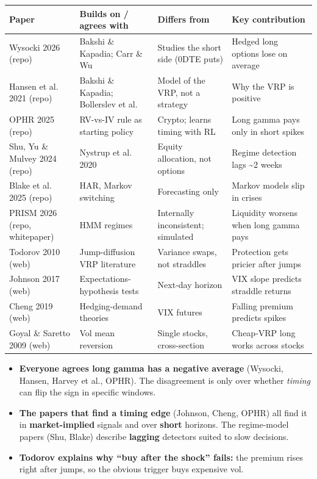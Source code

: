 \documentclass{article}
\begin{document}
\begin{center}\small
\begin{tabularx}{\linewidth}{>{\raggedright\arraybackslash}X >{\raggedright\arraybackslash}X >{\raggedright\arraybackslash}X >{\raggedright\arraybackslash}X}
\toprule
\textbf{Paper} & \textbf{Builds on /\allowbreak{} agrees with} & \textbf{Differs from} & \textbf{Key contribution} \\
\midrule
Wysocki 2026 (repo) & Bakshi \& Kapadia; Carr \& Wu & Studies the short side (0DTE puts) & Hedged long options lose on average \\
Hansen et al. 2021 (repo) & Bakshi \& Kapadia; Bollerslev et al. & Model of the VRP, not a strategy & Why the VRP is positive \\
OPHR 2025 (repo) & RV-vs-IV rule as starting policy & Crypto; learns timing with RL & Long gamma pays only in short spikes \\
Shu, Yu \& Mulvey 2024 (repo) & Nystrup et al. 2020 & Equity allocation, not options & Regime detection lags \textasciitilde{}2 weeks \\
Blake et al. 2025 (repo) & HAR, Markov switching & Forecasting only & Markov models slip in crises \\
PRISM 2026 (repo, whitepaper) & HMM regimes & Internally inconsistent; simulated & Liquidity worsens when long gamma pays \\
Todorov 2010 (web) & Jump-diffusion VRP literature & Variance swaps, not straddles & Protection gets pricier after jumps \\
Johnson 2017 (web) & Expectations-hypothesis tests & Next-day horizon & VIX slope predicts straddle returns \\
Cheng 2019 (web) & Hedging-demand theories & VIX futures & Falling premium predicts spikes \\
Goyal \& Saretto 2009 (web) & Vol mean reversion & Single stocks, cross-section & Cheap-VRP long works across stocks \\
\bottomrule
\end{tabularx}
\end{center}

\begin{itemize}

\item \textbf{Everyone agrees long gamma has a negative average} (Wysocki, Hansen, Harvey et al., OPHR). The disagreement is only over whether \emph{timing} can flip the sign in specific windows.

\item \textbf{The papers that find a timing edge} (Johnson, Cheng, OPHR) all find it in \textbf{market-implied} signals and over \textbf{short} horizons. The regime-model papers (Shu, Blake) describe \textbf{lagging} detectors suited to slow decisions.

\item \textbf{Todorov explains why ``buy after the shock'' fails:} the premium rises right after jumps, so the obvious trigger buys expensive vol.

\end{itemize}
\end{document}
